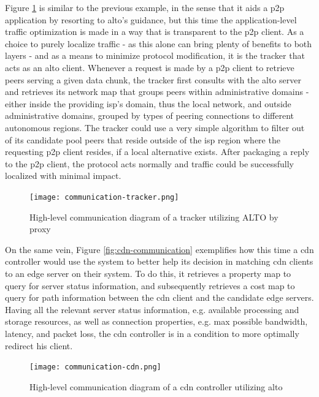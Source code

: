    Figure \ref{fig:communication-tracker} is similar to the previous example, in the sense that it aids a \gls{p2p} application by resorting to \gls{alto}'s guidance, but this time the application-level traffic optimization is made in a way that is transparent to the \gls{p2p} client.
    As a choice to purely localize traffic - as this alone can bring plenty of benefits to both layers - and as a means to minimize protocol modification, it is the tracker that acts as an \gls{alto} client.
    Whenever a request is made by a \gls{p2p} client to retrieve peers serving a given data chunk, the tracker first consults with the \gls{alto} server and retrieves its network map that groups peers within administrative domains - either inside the providing \gls{isp}'s domain, thus the local network, and outside administrative domains, grouped by types of peering connections to different autonomous regions.
    The tracker could use a very simple algorithm to filter out of its candidate pool peers that reside outside of the \gls{isp} region where the requesting \gls{p2p} client resides, if a local alternative exists.
    After packaging a reply to the \gls{p2p} client, the protocol acts normally and traffic could be successfully localized with minimal impact.

\begin{figure}[H]
        \centering
        \hspace*{-1em}
        \texttt{[image: communication-tracker.png]}
        \caption{High-level communication diagram of a tracker utilizing \gls{ALTO} by proxy}
        \label{fig:communication-tracker}
\end{figure}

    On the same vein, Figure \ref{fig:cdn-communication} exemplifies how this time a \gls{cdn} controller would use the system to better help its decision in matching \gls{cdn} clients to an edge server on their system.
    To do this, it retrieves a property map to query for server status information, and subsequently retrieves a cost map to query for path information between the \gls{cdn} client and the candidate edge servers.
    Having all the relevant server status information, e.g. available processing and storage resources, as well as connection properties, e.g. max possible bandwidth, latency, and packet loss, the \gls{cdn} controller is in a condition to more optimally redirect his client.

\begin{figure}[H]
        \centering
        \hspace*{-2em}
        \texttt{[image: communication-cdn.png]}
        \caption{High-level communication diagram of a \gls{cdn} controller utilizing \gls{alto}}
        \label{fig:communication-cdn}
\end{figure}

